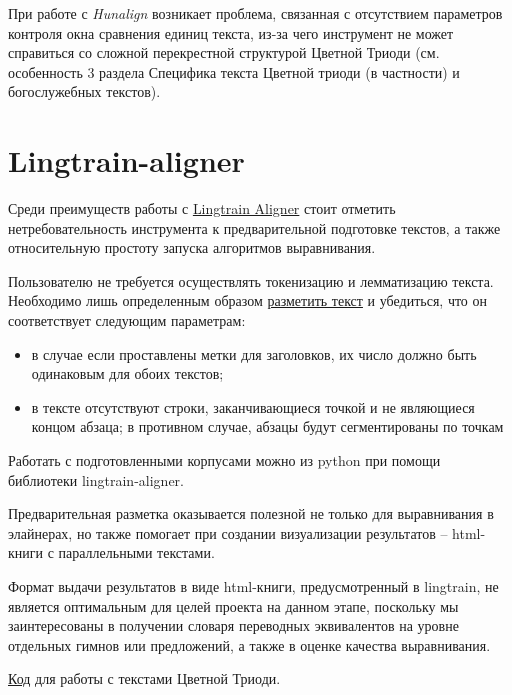 \documentclass[
  letterpaper,
]{book}
\providecommand{\tightlist}{%
  \setlength{\itemsep}{0pt}\setlength{\parskip}{0pt}}\usepackage{longtable,booktabs,array}
\begin{document}
При работе с \emph{Hunalign} возникает проблема, связанная с отсутствием
параметров контроля окна сравнения единиц текста, из-за чего инструмент
не может справиться со сложной перекрестной структурой Цветной Триоди
(см. особенность 3 раздела Специфика текста Цветной триоди (в частности)
и богослужебных текстов).

\hypertarget{lingtrain-aligner}{%
\section{Lingtrain-aligner}\label{lingtrain-aligner}}

Среди преимуществ работы с
\href{https://github.com/averkij/lingtrain-aligner}{Lingtrain Aligner}
стоит отметить нетребовательность инструмента к предварительной
подготовке текстов, а также относительную простоту запуска алгоритмов
выравнивания.

Пользователю не требуется осуществлять токенизацию и лемматизацию
текста. Необходимо лишь определенным образом
\href{https://habr.com/ru/articles/590549/}{разметить текст} и
убедиться, что он соответствует следующим параметрам:

\begin{itemize}
\tightlist
\item
  в случае если проставлены метки для заголовков, их число должно быть
  одинаковым для обоих текстов;
\item
  в тексте отсутствуют строки, заканчивающиеся точкой и не являющиеся
  концом абзаца; в противном случае, абзацы будут сегментированы по
  точкам
\end{itemize}

Работать с подготовленными корпусами можно из python при помощи
библиотеки lingtrain-aligner.

Предварительная разметка оказывается полезной не только для выравнивания
в элайнерах, но также помогает при создании визуализации результатов --
html-книги с параллельными текстами.

Формат выдачи результатов в виде html-книги, предусмотренный в
lingtrain, не является оптимальным для целей проекта на данном этапе,
поскольку мы заинтересованы в получении словаря переводных эквивалентов
на уровне отдельных гимнов или предложений, а также в оценке качества
выравнивания.

\href{https://github.com/Drozhzhinastya/GSPC/blob/main/scripts/aligners/Lingtrain_LABse.ipynb}{Код}
для работы с текстами Цветной Триоди.

\end{document}
